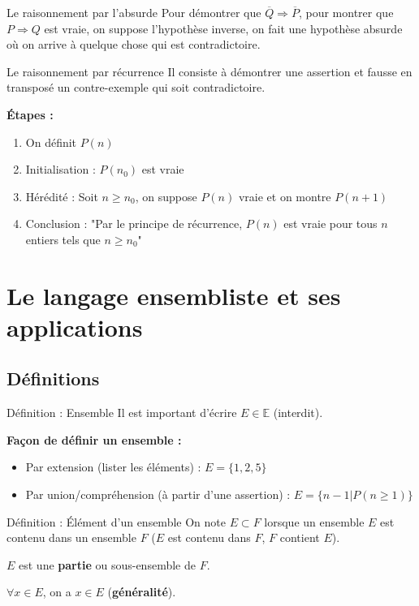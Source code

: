 \documentclass[a4paper,11pt]{article}
\begin{document}
\begin{methodbox}{Le raisonnement par l'absurde}
Pour démontrer que $\overline{Q} \Rightarrow \overline{P}$, pour montrer que $P \Rightarrow Q$ est vraie, on suppose l'hypothèse inverse, on fait une hypothèse absurde où on arrive à quelque chose qui est contradictoire.
\end{methodbox}

\begin{methodbox}{Le raisonnement par récurrence}
Il consiste à démontrer une assertion et fausse en transposé un contre-exemple qui soit contradictoire.

\textbf{Étapes :}
\begin{enumerate}
    \item[(A)] On définit $P(n)$
    \item[(2)] Initialisation : $P(n_0)$ est vraie
    \item[(3)] Hérédité : Soit $n \geq n_0$, on suppose $P(n)$ vraie et on montre $P(n+1)$
    \item[(4)] Conclusion : "Par le principe de récurrence, $P(n)$ est vraie pour tous $n$ entiers tels que $n \geq n_0$"
\end{enumerate}
\end{methodbox}

\newpage
\section{Le langage ensembliste et ses applications}

\subsection{Définitions}

\begin{defbox}{Définition : Ensemble}
Il est important d'écrire $E \in \mathbb{E}$ (interdit).

\textbf{Façon de définir un ensemble :}
\begin{itemize}
    \item Par extension (lister les éléments) : $E = \{1, 2, 5\}$
    \item Par union/compréhension (à partir d'une assertion) : $E = \{n - 1 | P(n \geq 1)\}$
\end{itemize}
\end{defbox}

\begin{defbox}{Définition : Élément d'un ensemble}
On note $E \subset F$ lorsque un ensemble $E$ est contenu dans un ensemble $F$ ($E$ est contenu dans $F$, $F$ contient $E$).

$E$ est une \textbf{partie} ou sous-ensemble de $F$.

$\forall x \in E$, on a $x \in E$ (\textbf{généralité}).
\end{defbox}
\end{document}
